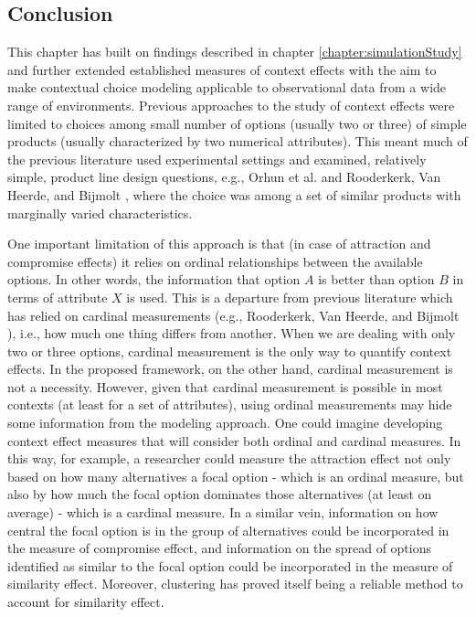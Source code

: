 \documentclass[a4paper,12pt]{article}
\newcommand{\citeyearonly}[1]{\citeyearpar{#1}}
\begin{document}
\clearpage

\subsection{Conclusion}

This chapter has built on findings described in chapter \ref{chapter:simulationStudy} and further extended established measures of context effects with the aim to make contextual choice modeling applicable to observational data from a wide range of environments. Previous approaches to the study of context effects were limited to choices among small number of options (usually two or three) of simple products (usually characterized by two numerical attributes). This meant much of the previous literature used experimental settings and examined, relatively simple, product line design questions, e.g., Orhun et al. \citeyearonly{orhun09} and Rooderkerk, Van Heerde, and Bijmolt \citeyearonly{roodrkerkEtAl11}, where the choice was among a set of similar products with marginally varied characteristics. 

One important limitation of this approach is that (in case of attraction and compromise effects) it relies on ordinal relationships between the available options. In other words, the information that option $A$ is better than option $B$ in terms of attribute $X$ is used. This is a departure from previous literature which has relied on cardinal measurements (e.g., Rooderkerk, Van Heerde, and Bijmolt \citeyearonly{roodrkerkEtAl11}), i.e., how much one thing differs from another. When we are dealing with only two or three options, cardinal measurement is the only way to quantify context effects. In the proposed framework, on the other hand, cardinal measurement is not a necessity. However, given that cardinal measurement is possible in most contexts (at least for a set of attributes), using ordinal measurements may hide some information from the modeling approach. One could imagine developing context effect measures that will consider both ordinal and cardinal measures. In this way, for example, a researcher could measure the attraction effect not only based on how many alternatives a focal option - which is an ordinal measure, but also by how much the focal option dominates those alternatives (at least on average) - which is a cardinal measure. In a similar vein, information on how central the focal option is in the group of alternatives could be incorporated in the measure of compromise effect, and information on the spread of options identified as similar to the focal option could be incorporated in the measure of similarity effect.  Moreover, clustering has proved itself being a reliable method to account for similarity effect.
\end{document}

